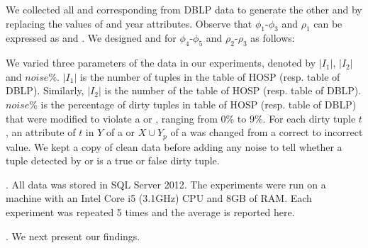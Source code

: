 {We collected all  and corresponding  from DBLP data to generate the other \pCFDs and \pCINDs by replacing the values of  and {year} attributes. Observe that $\phi _1$-$\phi _3$ and $\rho _1$ can be expressed as \CFDs and \CIND. We designed \CFDs and \CINDs for $\phi _4$-$\phi _5$ and $\rho _2$-$\rho _3$ as follows:

\begin{footnotesize}
\end{footnotesize}
}%


We varied three parameters of the data in our experiments, denoted by $|I_1|$, $|I_2|$ and $noise\%$. $|I_1|$ is the number of tuples in the table  of HOSP (resp. table  of DBLP). Similarly, $|I_2|$ is the number of the table  of HOSP (resp. table  of DBLP). $noise\%$ is the percentage of dirty tuples in table  of HOSP (resp. table  of DBLP) that were modified to violate a \pCFD or \pCIND, ranging from 0\% to 9\%. For each dirty tuple $t$, an attribute of $t$ in $Y$ of a \pCFD or $X \cup Y_p$ of a \pCIND was changed from a correct to incorrect value. We kept a copy of clean data before adding any noise to tell whether a tuple detected by \pCFDs or \pCINDs is a true or false dirty tuple.

. All data was stored in SQL Server 2012. The experiments were run on a machine with an Intel Core i5 (3.1GHz) CPU and 8GB of RAM. Each experiment was repeated 5 times and the average is reported here.

. We next present our findings.

